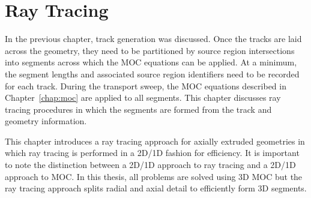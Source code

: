 \chapter{Ray Tracing}
\label{chap:ray-tracing}

In the previous chapter, track generation was discussed. Once the tracks are laid across the geometry, they need to be partitioned by source region intersections into segments across which the \ac{MOC} equations can be applied. At a minimum, the segment lengths and associated source region identifiers need to be recorded for each track. During the transport sweep, the \ac{MOC} equations described in Chapter~\ref{chap:moc} are applied to all segments. This chapter discusses ray tracing procedures in which the segments are formed from the track and geometry information. 

This chapter introduces a ray tracing approach for axially extruded geometries in which ray tracing is performed in a 2D/1D fashion for efficiency. It is important to note the distinction between a 2D/1D approach to ray tracing and a 2D/1D approach to \ac{MOC}. In this thesis, all problems are solved using 3D \ac{MOC} but the ray tracing approach splits radial and axial detail to efficiently form 3D segments.




